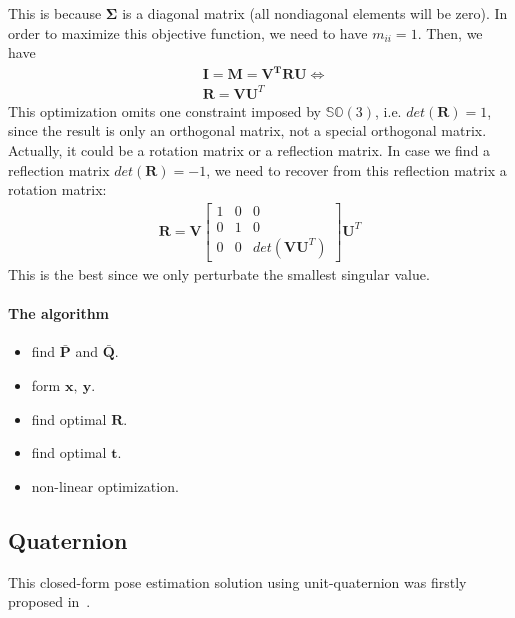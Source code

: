 \documentclass[a4paper]{report}
\begin{document}
This is because $\mathbf{\Sigma}$ is a diagonal matrix (all nondiagonal elements will be zero).
In order to maximize this objective function, we need to have $m_{ii}=1$. Then, we have
\begin{align*}
&\mathbf{I}=\mathbf{M}=\mathbf{V^TRU} \Leftrightarrow \\
&\mathbf{R}=\mathbf{VU}^T
\end{align*}
This optimization omits one constraint imposed by $\mathbb{SO}(3)$, i.e. $det(\mathbf{R})=1$, since the result is only an orthogonal matrix, not a special orthogonal matrix. Actually, it could be a rotation matrix or a reflection matrix. In case we find a reflection matrix $det(\mathbf{R})=-1$, we need to recover from this reflection matrix a rotation matrix:
\begin{align*}
\mathbf{R}=\mathbf{V}
\left[
\begin{matrix}
1 & 0 & 0 \\ 0&1&0 \\0&0&det(\mathbf{VU}^T)
\end{matrix}
\right]
\mathbf{U}^T
\end{align*}
This is the best since we only perturbate the smallest singular value.

\paragraph{The algorithm}
\begin{itemize}
	\item find $\bar{\mathbf{P}}$ and $\bar{\mathbf{Q}}$.
	\item form $\mathbf{x},\ \mathbf{y}$.
	\item find optimal $\mathbf{R}$.
	\item find optimal $\mathbf{t}$.
	\item non-linear optimization.
\end{itemize}

\subsection{Quaternion}
This closed-form pose estimation solution using unit-quaternion was firstly proposed in~\cite{horn1987closed}.
\end{document}

